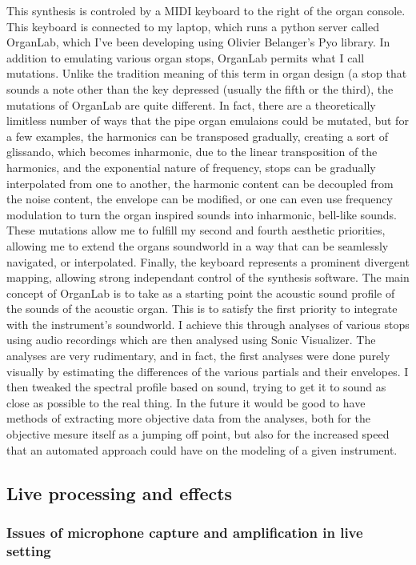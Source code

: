 \documentclass[12pt,twoside,maitrise]{dms_ks}
\theoremstyle{definition}
\begin{document}
This synthesis is controled by a MIDI keyboard to the right of the organ console. 
This keyboard is connected to my laptop, which runs a python server called OrganLab, which I've been developing using Olivier Belanger's Pyo library. 
In addition to emulating various organ stops, OrganLab permits what I call mutations. 
Unlike the tradition meaning of this term in organ design (a stop that sounds a note other than the key depressed (usually the fifth or the third), the mutations of OrganLab are quite different. 
In fact, there are a theoretically limitless number of ways that the pipe organ emulaions could be mutated, but for a few examples, the harmonics can be transposed gradually, creating a sort of glissando, which becomes inharmonic, due to the linear transposition of the harmonics, and the exponential nature of frequency, stops can be gradually interpolated from one to another, the harmonic content can be decoupled from the noise content, the envelope can be modified, or one can even use frequency modulation to turn the organ inspired sounds into inharmonic, bell-like sounds. 
These mutations allow me to fulfill my second and fourth aesthetic priorities, allowing me to extend the organs soundworld in a way that can be seamlessly navigated, or interpolated. 
Finally, the keyboard represents a prominent divergent mapping, allowing strong independant control of the synthesis software.  
The main concept of OrganLab is to take as a starting point the acoustic sound profile of the sounds of the acoustic organ. 
This is to satisfy the first priority to integrate with the instrument's soundworld. 
I achieve this through analyses of various stops using audio recordings which are then analysed using Sonic Visualizer. 
The analyses are very rudimentary, and in fact, the first analyses were done purely visually by estimating the differences of the various partials and their envelopes. 
I then tweaked the spectral profile based on sound, trying to get it to sound as close as possible to the real thing. 
In the future it would be good to have methods of extracting more objective data from the analyses, both for the objective mesure itself as a jumping off point, but also for the increased speed that an automated approach could have on the modeling of a given instrument.   

\subsection{Live processing and effects}

\subsubsection{Issues of microphone capture and amplification in live setting}
\end{document}
